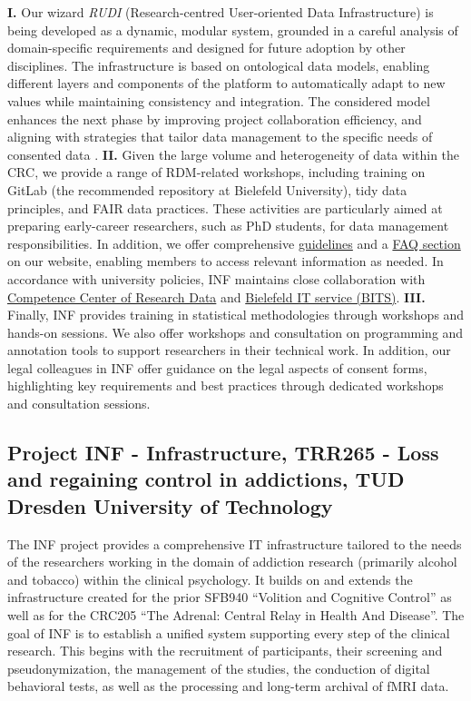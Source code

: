 \documentclass{eceasst}
\begin{document}
\textbf{I.} Our wizard \textit{RUDI} (Research-centred User-oriented Data Infrastructure) is being developed as a dynamic, modular system, grounded in a careful analysis of domain-specific requirements and designed for future adoption by other disciplines.
The infrastructure is based on ontological data models, enabling different layers and components of the platform to automatically adapt to new values while maintaining consistency and integration.
The considered model enhances the next phase by improving project collaboration efficiency, and aligning with strategies that tailor data management to the specific needs of consented data \cite{Mohammadietal2026}. %
\textbf{II.} Given the large volume and heterogeneity of data within the CRC, we provide a range of RDM-related workshops, including training on GitLab (the recommended repository at Bielefeld University), tidy data principles, and FAIR data practices. These activities are particularly aimed at preparing early-career researchers, such as PhD students, for data management responsibilities. In addition, we offer comprehensive \href{https://crc1646.pages.ub.uni-bielefeld.de/inf/website/wiki/site/index.html}{guidelines} and a \href{https://crc1646.pages.ub.uni-bielefeld.de/inf/website/faq.html}{FAQ section} on our website, enabling members to access relevant information as needed. In accordance with university policies, INF maintains close collaboration with \href{https://www.uni-bielefeld.de/ub/digital/forschungsdaten/kompetenzzentrum/}{Competence Center of Research Data} and \href{https://www.uni-bielefeld.de/einrichtungen/bits/ueber-uns/index.xml}{Bielefeld IT service (BITS)}. 
\textbf{III.} Finally, INF provides training in statistical methodologies through workshops and hands-on sessions. We also offer workshops and consultation on programming and annotation tools to support researchers in their technical work. In addition, our legal colleagues in INF offer guidance on the legal aspects of consent forms, highlighting key requirements and best practices through dedicated workshops and consultation sessions.

\subsection{Project INF - Infrastructure, TRR265 - Loss and regaining control in addictions, TUD Dresden University of Technology}

The INF project provides a comprehensive IT infrastructure tailored to the needs of the researchers working in the domain of addiction research (primarily alcohol and tobacco) within the clinical psychology. It builds on and extends the infrastructure created for the prior SFB940 ``Volition and Cognitive Control'' as well as for the CRC205 ``The Adrenal: Central Relay in Health And Disease''. The goal of INF is to establish a unified system supporting every step of the clinical research. This begins with the recruitment of participants, their screening and pseudonymization, the management of the studies, the conduction of digital behavioral tests, as well as the processing and long-term archival of fMRI data.
\end{document}
